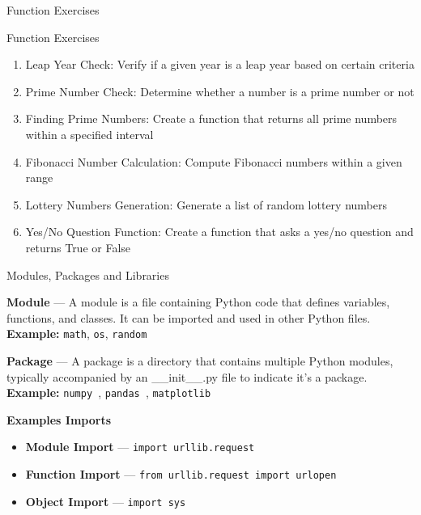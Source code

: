 \documentclass[
	11pt, 
]{beamer}
\begin{document}


\begin{frame}[fragile]{Function Exercises}

\begin{alertblock}{Function Exercises}
    \begin{enumerate}
        \item Leap Year Check: Verify if a given year is a leap year based on certain criteria
        \item Prime Number Check: Determine whether a number is a prime number or not
        \item Finding Prime Numbers: Create a function that returns all prime numbers within a specified interval
        \item Fibonacci Number Calculation: Compute Fibonacci numbers within a given range
        \item Lottery Numbers Generation: Generate a list of random lottery numbers
        \item Yes/No Question Function: Create a function that asks a yes/no question and returns True or False
    \end{enumerate}
\end{alertblock}

\end{frame}



\begin{frame}[fragile]{Modules, Packages and Libraries}

\textbf{Module} --- A module is a file containing Python code that defines variables, functions, and classes. It can be imported and used in other Python files. \textbf{Example:} \texttt{math}, \texttt{os}, \texttt{random}

\vspace{.5cm}

\textbf{Package} --- A package is a directory that contains multiple Python modules, typically accompanied by an \_\_init\_\_.py file to indicate it's a package. \textbf{Example:} \texttt{numpy }, \texttt{pandas }, \texttt{matplotlib}

\vspace{.5cm}


\begin{block}{\textbf{Examples Imports}}
    \begin{itemize}
        \item \textbf{Module Import} --- \texttt{import urllib.request}
        \item \textbf{Function Import} --- \texttt{from urllib.request import urlopen}
        \item \textbf{Object Import} --- \texttt{import sys}
    \end{itemize}
\end{block}


\end{frame}
\end{document}
